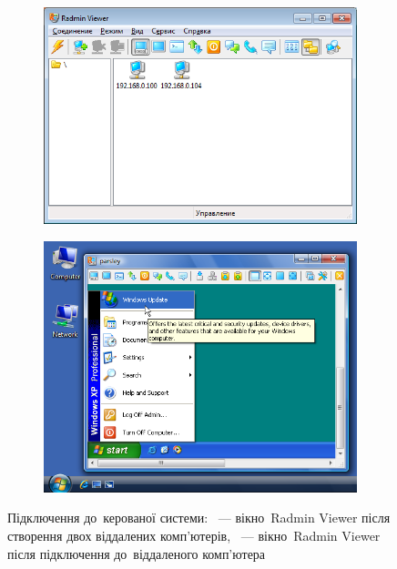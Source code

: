 \documentclass[
	a4paper,
	oneside,
	BCOR = 10mm,
	DIV = 12,
	12pt,
	headings = normal,
]{scrartcl}
\begin{document}
			\begin{figure}[!htbp]
				\centering
				\begin{subfigure}{0.5\columnwidth - 0.5em}
					\centering
					\includegraphics[width = \columnwidth]{./assets/p16-02.png}
					\caption{}
					\label{subfig:05-radmin-02-01}
				\end{subfigure}%
				\hspace{1em}%
				\begin{subfigure}{0.5\columnwidth - 0.5em}
					\centering
					\includegraphics[width = \columnwidth]{./assets/p16-03.png}
					\caption{}
					\label{subfig:05-radmin-02-02}
				\end{subfigure}
				\caption{Підключення до~керованої системи: ~— вікно~\textenglish{Radmin Viewer} після створення двох віддалених комп'ютерів, ~— вікно~\textenglish{Radmin Viewer} після підключення до~віддаленого комп'ютера}
				\label{fig:05-radmin-02}
			\end{figure}
\end{document}
